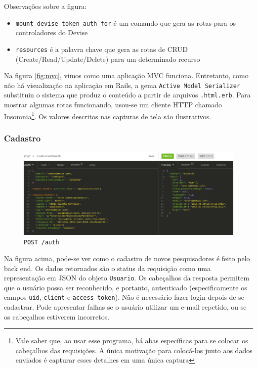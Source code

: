 Observações sobre a figura:
\begin{itemize}
  \item \texttt{mount\_devise\_token\_auth\_for} é um comando que gera as rotas para os controladores do Devise
  \item \texttt{resources} é a palavra chave que gera as rotas de CRUD (Create/Read/Update/Delete) para um determinado
  recurso
\end{itemize}

Na figura \ref{fig:mvc}, vimos como uma aplicação MVC funciona. Entretanto, como não há visualização na aplicação em Rails,
a gema \texttt{Active Model Serializer} substituiu o sistema que produz o conteúdo a partir de arquivos \texttt{.html.erb}.
Para mostrar algumas rotas funcionando, usou-se um cliente HTTP chamado Insomnia\footnote{Vale saber que, ao usar esse
programa, há abas específicas para se colocar os cabeçalhos das requisições. A única motivação para colocá-los junto aos
dados enviados é capturar esses detalhes em uma única captura}. Os valores descritos nas capturas de tela são ilustrativos.

\subsubsection{Cadastro}

\begin{figure}[ht]
  \centering
  \includegraphics[width=.75\textwidth]{figuras/sign-up.png}
  \caption{\texttt{POST /auth}}
  \label{fig:sign-up}
\end{figure}

Na figura acima, pode-se ver como o cadastro de novos pesquisadores é feito pelo back end. Os dados retornados são
o status da requisição como uma representação em JSON do objeto \texttt{Usuario}. Os cabeçalhos da resposta permitem que
o usuário possa ser reconhecido, e portanto, autenticado (especificamente os campos \texttt{uid}, \texttt{client} e
\texttt{access-token}). Não é necessário fazer login depois de se cadastrar. Pode apresentar falhas se o usuário utilizar
um e-mail repetido, ou se os cabeçalhos estiverem incorretos.

